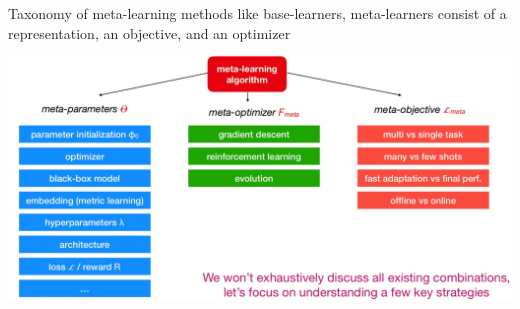 \begin{frame}{Taxonomy of meta-learning methods}
    \small like base-learners, meta-learners consist of a representation, an objective, and an optimizer
    \centering\includegraphics[height=7cm]{image/img004820.jpg}
\end{frame}

